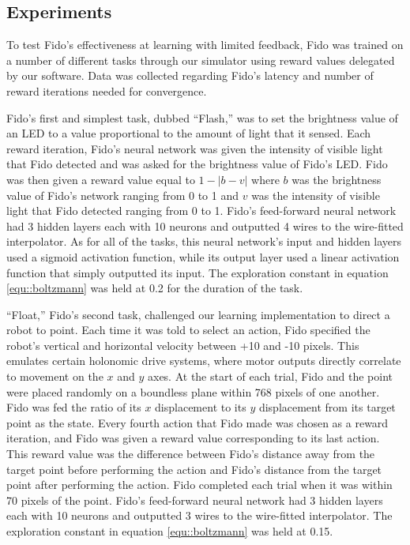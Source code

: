 \subsection{Experiments}

To test Fido's effectiveness at learning with limited feedback, Fido was trained on a number of different tasks through our simulator using reward values delegated by our software. Data was collected regarding Fido's latency and number of reward iterations needed for convergence.

Fido's first and simplest task, dubbed ``Flash,'' was to set the brightness value of an LED to a value proportional to the amount of light that it sensed. Each reward iteration, Fido's neural network was given the intensity of visible light that Fido detected and was asked for the brightness value of Fido's LED. Fido was then given a reward value equal to $1 - |b - v|$ where $b$ was the brightness value of Fido's network ranging from 0 to 1 and $v$ was the intensity of visible light that Fido detected ranging from 0 to 1. Fido's feed-forward neural network had 3 hidden layers each with 10 neurons and outputted 4 wires to the wire-fitted interpolator. As for all of the tasks, this neural network's input and hidden layers used a sigmoid activation function, while  its output layer used a linear activation function that simply outputted its input. The exploration constant in equation \ref{equ::boltzmann} was held at 0.2 for the duration of the task.

``Float,'' Fido's second task, challenged our learning implementation to direct a robot to point. Each time it was told to select an action, Fido specified the robot's vertical and horizontal velocity between +10 and -10 pixels. This emulates certain holonomic drive systems, where motor outputs directly correlate to movement on the $x$ and $y$ axes. At the start of each trial, Fido and the point were placed randomly on a boundless plane within 768 pixels of one another. Fido was fed the ratio of its $x$ displacement to its $y$ displacement from its target point as the state. Every fourth action that Fido made was chosen as a reward iteration, and Fido was given a reward value corresponding to its last action. This reward value was the difference between Fido's distance away from the target point before performing the action and Fido's distance from the target point after performing the action. Fido completed each trial when it was within 70 pixels of the point. Fido's feed-forward neural network had 3 hidden layers each with 10 neurons and outputted 3 wires to the wire-fitted interpolator. The exploration constant in equation \ref{equ::boltzmann} was held at 0.15.

